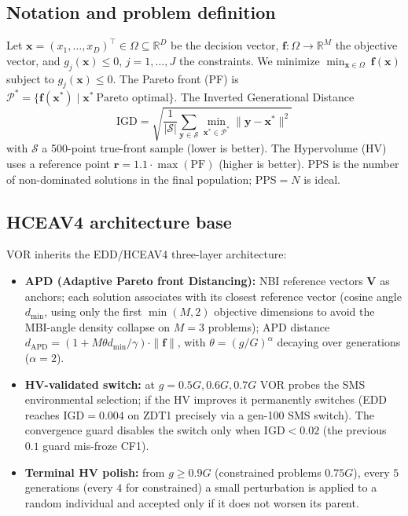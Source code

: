 \documentclass[preprint,12pt]{elsarticle}
\begin{document}
\subsection{Notation and problem definition}
\label{sec:notation}
Let $\mathbf{x}=(x_1,\dots,x_D)^\top\in\Omega\subseteq\mathbb{R}^D$ be the
decision vector, $\mathbf{f}:\Omega\to\mathbb{R}^M$ the objective vector,
and $g_j(\mathbf{x})\le 0$, $j=1,\dots,J$ the constraints. We minimize
$\min_{\mathbf{x}\in\Omega}\ \mathbf{f}(\mathbf{x})$ subject to
$g_j(\mathbf{x})\le 0$. The Pareto front (PF) is
$\mathcal{P}^*=\{\mathbf{f}(\mathbf{x}^*)\mid \mathbf{x}^*\ \text{Pareto
optimal}\}$. The Inverted Generational Distance
\begin{equation}
\mathrm{IGD} = \sqrt{\frac{1}{|\mathcal{S}|}\sum_{\mathbf{y}\in\mathcal{S}}
\min_{\mathbf{x}^*\in\mathcal{P}^*}\|\mathbf{y}-\mathbf{x}^*\|^2}
\end{equation}
with $\mathcal{S}$ a 500-point true-front sample (lower is better). The
Hypervolume (HV) uses a reference point $\mathbf{r}=1.1\cdot\max(\mathrm{PF})$
(higher is better). PPS is the number of non-dominated solutions in the final
population; PPS$=N$ is ideal.

\subsection{HCEAV4 architecture base}
\label{sec:base}
VOR inherits the EDD/HCEAV4 three-layer architecture:
\begin{itemize}
\item \textbf{\textsc{APD} (Adaptive Pareto front Distancing):} NBI
  reference vectors $\mathbf{V}$ as anchors; each solution associates with
  its closest reference vector (cosine angle $d_{\min}$, using only the
  first $\min(M,2)$ objective dimensions to avoid the MBI-angle density
  collapse on $M=3$ problems); APD distance
  $d_{\mathrm{APD}}=(1+M\theta d_{\min}/\gamma)\cdot\|\mathbf{f}\|$, with
  $\theta=(g/G)^{\alpha}$ decaying over generations ($\alpha=2$).
\item \textbf{HV-validated switch:} at $g=0.5G,0.6G,0.7G$ VOR probes the
  \textsc{SMS} environmental selection; if the HV improves it permanently
  switches (\textsc{EDD} reaches IGD$=0.004$ on \textsc{ZDT1} precisely via
  a gen-100 \textsc{SMS} switch). The convergence guard disables the switch
  only when $\mathrm{IGD}<0.02$ (the previous $0.1$ guard mis-froze
  \textsc{CF1}).
\item \textbf{Terminal HV polish:} from $g\ge 0.9G$ (constrained problems
  $0.75G$), every $5$ generations (every $4$ for constrained) a small
  perturbation is applied to a random individual and accepted only if it
  does not worsen its parent.
\end{itemize}
\end{document}
